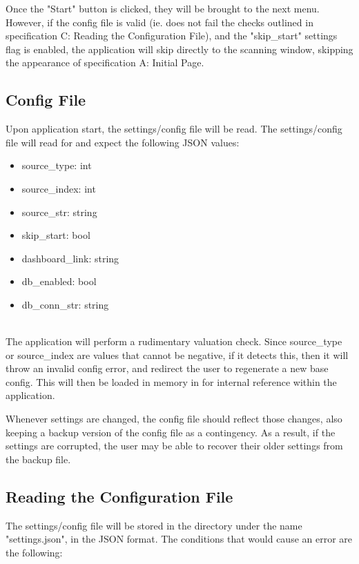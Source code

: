 \documentclass[conference]{IEEEtran}
\begin{document}
Once the "Start" button is clicked, they will be brought to the next menu. However, if the config file is valid (ie. does not fail the checks outlined in specification C: Reading the Configuration File), and the "skip\_start" settings flag is enabled, the application will skip directly to the scanning window, skipping the appearance of specification A: Initial Page.~\\

\subsection{Config File}
Upon application start, the settings/config file will be read. The settings/config file will read for and expect the following JSON values:~\\

\begin{itemize}
\item source\_type: int
\item source\_index: int
\item source\_str: string
\item skip\_start: bool
\item dashboard\_link: string
\item db\_enabled: bool
\item db\_conn\_str: string
\end{itemize}~\\

The application will perform a rudimentary valuation check. Since source\_type or source\_index are values that cannot be negative, if it detects this, then it will throw an invalid config error, and redirect the user to regenerate a new base config. This will then be loaded in memory in for internal reference within the application.

Whenever settings are changed, the config file should reflect those changes, also keeping a backup version of the config file as a contingency. As a result, if the settings are corrupted, the user may be able to recover their older settings from the backup file.~\\

\subsection{Reading the Configuration File}
The settings/config file will be stored in the directory under the name "settings.json", in the JSON format. The conditions that would cause an error are the following:~\\
\end{document}
